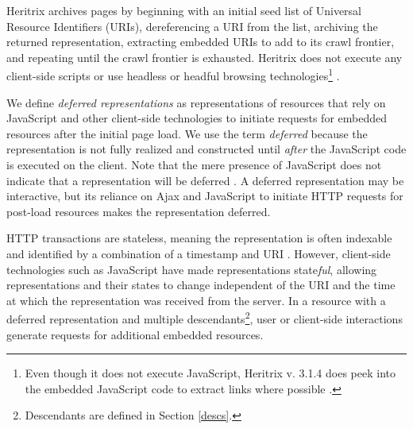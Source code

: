 \documentclass{sig-alternate}
\begin{document}
Heritrix archives pages by beginning with an initial seed list of Universal Resource Identifiers (URIs), dereferencing a URI from the list, archiving the returned representation, extracting embedded URIs to add to its crawl frontier, and repeating until the crawl frontier is exhausted. Heritrix does not execute any client-side scripts or use headless or headful browsing technologies\footnote{Even though it does not execute JavaScript, Heritrix v. 3.1.4 does peek into the embedded JavaScript code to extract links where possible \cite{htrixJS}.} \cite{googleJS}. 

We define \emph{deferred representations} as representations of resources that rely on JavaScript and other client-side technologies to initiate requests for embedded resources after the initial page load. We use the term \emph{deferred} because the representation is not fully realized and constructed until \emph{after} the JavaScript code is executed on the client. 
Note that the mere presence of JavaScript does not indicate that a representation will be deferred%
. A deferred representation may be interactive, but its reliance on Ajax and JavaScript to initiate HTTP requests for post-load resources makes the representation deferred.

HTTP transactions are stateless, meaning the representation is often indexable and identified by a combination of a timestamp and URI \cite{Fielding:2002:PDM:514183.514185}. However, 
client-side technologies such as JavaScript have made representations state\emph{ful}, allowing representations and their states to change independent of the URI and the time at which the representation was received from the server. In a resource with a deferred representation and multiple descendants\footnote{Descendants are defined in Section \ref{descs}.}, user or client-side interactions generate requests for additional embedded resources.

\end{document}
